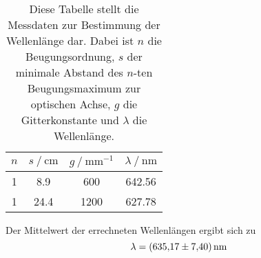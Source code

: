 \begin{table}
    \centering
    \begin{tabular}{c c c c}
        \toprule
        {$n$} & {$s \mathbin{/} \unit{\centi\metre}$} & {$g \mathbin{/} \unit{\milli\metre}^{-1}$} & {$\lambda \mathbin{/} \unit{\nano\metre}$}\\
        \midrule
         1  &  8.9 &  600 & 642.56 \\
         1  & 24.4 & 1200 & 627.78 \\

        \bottomrule
    \end{tabular}
    \caption{Diese Tabelle stellt die Messdaten zur Bestimmung der Wellenlänge dar. Dabei ist $n$ die Beugungsordnung, $s$ der minimale Abstand des $n$-ten Beugungsmaximum zur optischen Achse,
    $g$ die Gitterkonstante und $\lambda$ die Wellenlänge.}
    \label{tab:wellenlaenge}
\end{table}

Der Mittelwert der errechneten Wellenlängen ergibt sich zu 
\begin{equation*}
    \lambda = \qty{635.17 +- 7.40}{\nano\metre}
\end{equation*} 
